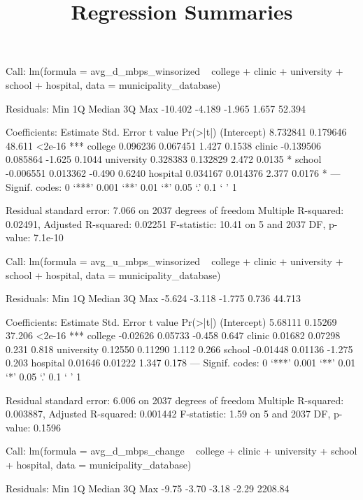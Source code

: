 \documentclass{article}
\begin{document}
\title{Regression Summaries}
\maketitle

Call:
lm(formula = avg\_d\_mbps\_winsorized ~ college + clinic + university + 
    school + hospital, data = municipality\_database)

Residuals:
    Min      1Q  Median      3Q     Max 
-10.402  -4.189  -1.965   1.657  52.394 

Coefficients:
             Estimate Std. Error t value Pr(>|t|)    
(Intercept)  8.732841   0.179646  48.611   <2e-16 ***
college      0.096236   0.067451   1.427   0.1538    
clinic      -0.139506   0.085864  -1.625   0.1044    
university   0.328383   0.132829   2.472   0.0135 *  
school      -0.006551   0.013362  -0.490   0.6240    
hospital     0.034167   0.014376   2.377   0.0176 *  
---
Signif. codes:  0 ‘***’ 0.001 ‘**’ 0.01 ‘*’ 0.05 ‘.’ 0.1 ‘ ’ 1

Residual standard error: 7.066 on 2037 degrees of freedom
Multiple R-squared:  0.02491,	Adjusted R-squared:  0.02251 
F-statistic: 10.41 on 5 and 2037 DF,  p-value: 7.1e-10

\newpage

Call:
lm(formula = avg\_u\_mbps\_winsorized ~ college + clinic + university + 
    school + hospital, data = municipality\_database)

Residuals:
   Min     1Q Median     3Q    Max 
-5.624 -3.118 -1.775  0.736 44.713 

Coefficients:
            Estimate Std. Error t value Pr(>|t|)    
(Intercept)  5.68111    0.15269  37.206   <2e-16 ***
college     -0.02626    0.05733  -0.458    0.647    
clinic       0.01682    0.07298   0.231    0.818    
university   0.12550    0.11290   1.112    0.266    
school      -0.01448    0.01136  -1.275    0.203    
hospital     0.01646    0.01222   1.347    0.178    
---
Signif. codes:  0 ‘***’ 0.001 ‘**’ 0.01 ‘*’ 0.05 ‘.’ 0.1 ‘ ’ 1

Residual standard error: 6.006 on 2037 degrees of freedom
Multiple R-squared:  0.003887,	Adjusted R-squared:  0.001442 
F-statistic:  1.59 on 5 and 2037 DF,  p-value: 0.1596

\newpage

Call:
lm(formula = avg\_d\_mbps\_change ~ college + clinic + university + 
    school + hospital, data = municipality\_database)

Residuals:
    Min      1Q  Median      3Q     Max 
  -9.75   -3.70   -3.18   -2.29 2208.84 
\end{document}
